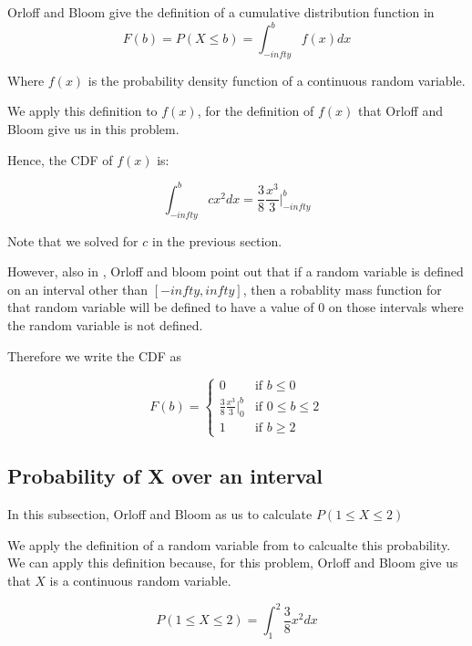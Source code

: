 \documentclass[a4paper,11pt]{article}
\begin{document}
Orloff and Bloom give the definition of a cumulative distribution function in
\cite{reading5b}
\begin{equation}
    F \left( b \right) = P \left( X \leq b \right)
      = \int_{-infty}^{b} f \left( x \right) dx
\end{equation}

Where $f\left( x \right)$ is the probability density function of a continuous
random variable.

We apply this definition to $f\left( x \right)$, for the definition of
$f\left( x \right)$ that Orloff and Bloom give us in this problem.

Hence, the CDF of $f \left( x \right)$ is:

\begin{equation}
    \int_{-infty}^{b} c x^{2} dx
      = \frac{3}{8} \frac{x^{3}}{3} \bigg\rvert_{-infty}^{b}
\end{equation}

Note that we solved for $c$ in the previous section.

However, also in \cite{reading5b}, Orloff and bloom point out that if a random
variable is defined on an interval other than $\left[-infty, infty \right]$,
then a robablity mass function for that random variable will be defined to
have a value of $0$ on those intervals where the random variable is not
defined.

Therefore we write the CDF as

\[
F \left( b \right) =
\begin{cases}
  0 & \text{if } b \leq 0 \\
   \frac{3}{8} \frac{x^{3}}{3} \bigg\rvert_{0}^{b}
    & \text{if } 0 \leq b \leq 2 \\
   1 & \text{if } b \geq 2
\end{cases}
\]
\subsection{Probability of X over an interval}

In this subsection, Orloff and Bloom as us to calculate
$P \left( 1 \leq X \leq 2 \right)$

We apply the definition of a random variable from \cite{reading5b} to calcualte
this probability. We can apply this definition because, for this problem,
Orloff and Bloom give us that $X$ is a continuous random variable.

\begin{equation}
P \left( 1 \leq X \leq 2 \right) = \int_{1}^{2} \frac{3}{8} x^{2} dx
\end{equation}
\end{document}
